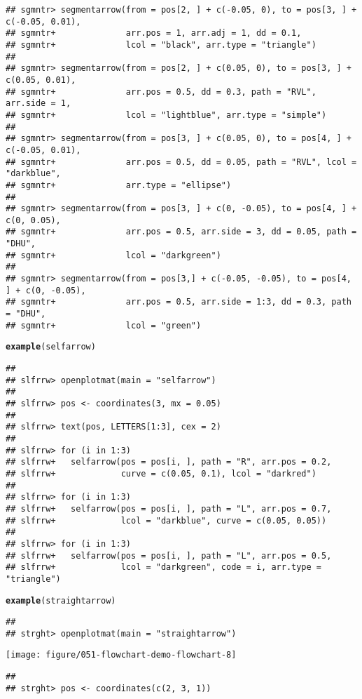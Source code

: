 \documentclass{article}\usepackage[]{graphicx}\usepackage[]{color}
\makeatletter
\def\maxwidth{ %
  \ifdim\Gin@nat@width>\linewidth
    \linewidth
  \else
    \Gin@nat@width
  \fi
}
\newcommand{\hlstd}[1]{\textcolor[rgb]{0.345,0.345,0.345}{#1}}%
\newcommand{\hlkwd}[1]{\textcolor[rgb]{0.737,0.353,0.396}{\textbf{#1}}}%
\newenvironment{kframe}{%
 \def\at@end@of@kframe{}%
 \ifinner\ifhmode%
  \def\at@end@of@kframe{\end{minipage}}%
  \begin{minipage}{\columnwidth}%
 \fi\fi%
 \def\FrameCommand##1{\hskip\@totalleftmargin \hskip-\fboxsep
 \colorbox{shadecolor}{##1}\hskip-\fboxsep
     \hskip-\linewidth \hskip-\@totalleftmargin \hskip\columnwidth}%
 \MakeFramed {\advance\hsize-\width
   \@totalleftmargin\z@ \linewidth\hsize
   \@setminipage}}%
 {\par\unskip\endMakeFramed%
 \at@end@of@kframe}
\newenvironment{knitrout}{}{} %
\makeatother
\begin{document}
\begin{knitrout}
\begin{kframe}
\begin{verbatim}
## sgmntr> segmentarrow(from = pos[2, ] + c(-0.05, 0), to = pos[3, ] + c(-0.05, 0.01),
## sgmntr+              arr.pos = 1, arr.adj = 1, dd = 0.1,
## sgmntr+              lcol = "black", arr.type = "triangle")
## 
## sgmntr> segmentarrow(from = pos[2, ] + c(0.05, 0), to = pos[3, ] + c(0.05, 0.01),
## sgmntr+              arr.pos = 0.5, dd = 0.3, path = "RVL", arr.side = 1,
## sgmntr+              lcol = "lightblue", arr.type = "simple")  
## 
## sgmntr> segmentarrow(from = pos[3, ] + c(0.05, 0), to = pos[4, ] + c(-0.05, 0.01),
## sgmntr+              arr.pos = 0.5, dd = 0.05, path = "RVL", lcol = "darkblue",
## sgmntr+              arr.type = "ellipse")  
## 
## sgmntr> segmentarrow(from = pos[3, ] + c(0, -0.05), to = pos[4, ] + c(0, 0.05),
## sgmntr+              arr.pos = 0.5, arr.side = 3, dd = 0.05, path = "DHU",
## sgmntr+              lcol = "darkgreen")  
## 
## sgmntr> segmentarrow(from = pos[3,] + c(-0.05, -0.05), to = pos[4, ] + c(0, -0.05),
## sgmntr+              arr.pos = 0.5, arr.side = 1:3, dd = 0.3, path = "DHU",
## sgmntr+              lcol = "green")
\end{verbatim}
\begin{alltt}
\hlkwd{example}\hlstd{(selfarrow)}
\end{alltt}
\begin{verbatim}
## 
## slfrrw> openplotmat(main = "selfarrow")
## 
## slfrrw> pos <- coordinates(3, mx = 0.05)
## 
## slfrrw> text(pos, LETTERS[1:3], cex = 2)
## 
## slfrrw> for (i in 1:3) 
## slfrrw+   selfarrow(pos = pos[i, ], path = "R", arr.pos = 0.2,
## slfrrw+             curve = c(0.05, 0.1), lcol = "darkred")
## 
## slfrrw> for (i in 1:3) 
## slfrrw+   selfarrow(pos = pos[i, ], path = "L", arr.pos = 0.7,
## slfrrw+             lcol = "darkblue", curve = c(0.05, 0.05))
## 
## slfrrw> for (i in 1:3) 
## slfrrw+   selfarrow(pos = pos[i, ], path = "L", arr.pos = 0.5,
## slfrrw+             lcol = "darkgreen", code = i, arr.type = "triangle")
\end{verbatim}
\begin{alltt}
\hlkwd{example}\hlstd{(straightarrow)}
\end{alltt}
\begin{verbatim}
## 
## strght> openplotmat(main = "straightarrow")
\end{verbatim}
\end{kframe}
\texttt{[image: figure/051-flowchart-demo-flowchart-8]} 
\begin{kframe}\begin{verbatim}
## 
## strght> pos <- coordinates(c(2, 3, 1))

\end{verbatim}
\end{kframe}
\end{knitrout}
\end{document}
